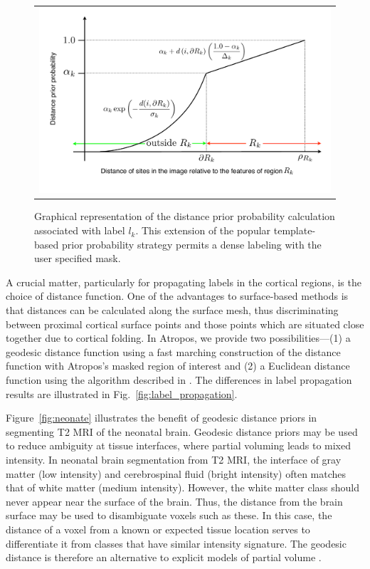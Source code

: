 \documentclass[11pt,english]{article}
\begin{document}
\begin{figure}
\begin{center}
\begin{tabular}{c}
\includegraphics[width=150mm]{distancePrior.pdf}
\end{tabular}
\caption{\baselineskip 12pt \small Graphical representation of the distance prior probability calculation associated with label $l_k$.  This extension of the popular template-based prior probability strategy permits a dense labeling with the user specified mask. }
\label{fig:distancePrior}
\end{center}
\end{figure}



A crucial matter, particularly for propagating labels in the cortical
regions, is the choice of distance function.  One of the advantages to
surface-based methods is that distances can be calculated along the
surface mesh, thus discriminating between proximal cortical surface
points and those points which are situated close together due to
cortical folding.  In Atropos, we provide two possibilities---(1) a
geodesic distance function using a fast marching construction
\citep{Osher1988} of the distance function with Atropos's masked
region of interest and (2) a Euclidean distance function using the algorithm described in \cite{Maurer2003}.  The differences in label propagation results are illustrated in Fig.~\ref{fig:label_propagation}.   

Figure~\ref{fig:neonate} illustrates the benefit of geodesic distance
priors in segmenting T2 MRI of the 
neonatal brain.  Geodesic distance priors may be used to reduce ambiguity at
tissue interfaces, where partial voluming leads to mixed intensity.  
In neonatal brain segmentation from T2 MRI, the
interface of gray matter (low intensity) and cerebrospinal fluid
(bright intensity) often matches that of white matter (medium intensity). 
However, the white matter class should never appear near the surface
of the brain.  Thus, the distance from the brain surface may be used
to disambiguate voxels such as these.  
In this case, the distance of a voxel from a known
or expected tissue location serves to differentiate it from classes
that have similar intensity signature.  The geodesic distance is therefore an
alternative to explicit models of partial volume \citep{Ruan2000,Ballester2002,Leemput2003}. 
\end{document}
